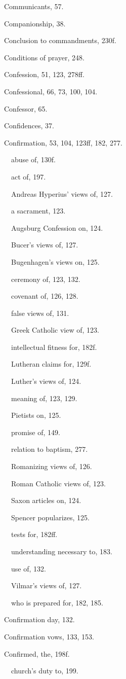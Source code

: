 \begin{originalinhalt}
Communicants, 57.

Companionship, 38.

Conclusion to commandments, 230f.

Conditions of prayer, 248.

Confession, 51, 123, 278ff.

Confessional, 66, 73, 100, 104.

Confessor, 65.

Confidences, 37.

Confirmation, 53, 104, 123ff, 182, 277.

 abuse of, 130f.

 act of, 197.

 Andreas Hyperius’ views of, 127.

 a sacrament, 123.

 Augsburg Confession on, 124.

 Bucer’s views of, 127.

 Bugenhagen’s views on, 125.

 ceremony of, 123, 132.

 covenant of, 126, 128.

 false views of, 131.

 Greek Catholic view of, 123.

 intellectual fitness for, 182f.

 Lutheran claims for, 129f.

 Luther’s views of, 124.

 meaning of, 123, 129.

 Pietists on, 125.

 promise of, 149.

 relation to baptism, 277.

 Romanizing views of, 126.

 Roman Catholic views of, 123.

 Saxon articles on, 124.

 Spencer popularizes, 125.

 tests for, 182ff.

 understanding necessary to, 183.

 use of, 132.

 Vilmar’s views of, 127.

 who is prepared for, 182, 185.

Confirmation day, 132.

Confirmation vows, 133, 153.

Confirmed, the, 198f.

 church’s duty to, 199.


\end{originalinhalt}

